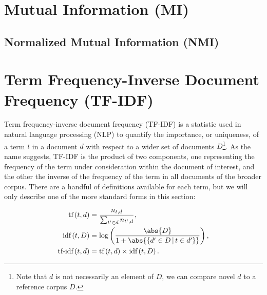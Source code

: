 \section{Mutual Information (MI)}
\label{dim_reduct:MI}

\subsection{Normalized Mutual Information (NMI)}
\label{dim_reduct:MI:normalized}

\section{Term Frequency-Inverse Document Frequency (TF-IDF)}
\label{dim_reduct:tfidf}

Term frequency-inverse document frequency (TF-IDF) is a statistic
used in natural language processing (NLP) to quantify
the importance, or uniqueness, of a term $t$ in a document $d$
with respect to a wider set of documents $D$\footnote{Note that $d$ is not necessarily an element of $D$, we can compare novel $d$ to a reference corpus $D$.}.
As the name suggests, TF-IDF is the product of two components,
one representing the frequency of the term under consideration within the document of interest,
and the other the inverse of the frequency of the term in all documents of the broader corpus.
There are a handful of definitions available for each term, but we will only describe
one of the more standard forms in this section:

\begin{subequations}\label{eq:unsupervised:tfidf}
\begin{align}
\text{tf}\left(t,d\right) &= \frac{n_{t,d}}{\sum_{t' \in d} n_{t',d}}, \label{eq:unsupervised:tfidf:tf} \\
\text{idf}\left(t,D\right) &= \log\left(\frac{\abs{D}}{1 + \abs{\left\{d' \in D \, | \, t \in d'\right\}}}\right), \label{eq:unsupervised:tfidf:idf} \\
\text{tf-idf}\left(t,d\right) &= \text{tf}\left(t,d\right) \times \text{idf}\left(t,D\right). \label{eq:unsupervised:tfidf:tfidf}
\end{align}
\end{subequations}

